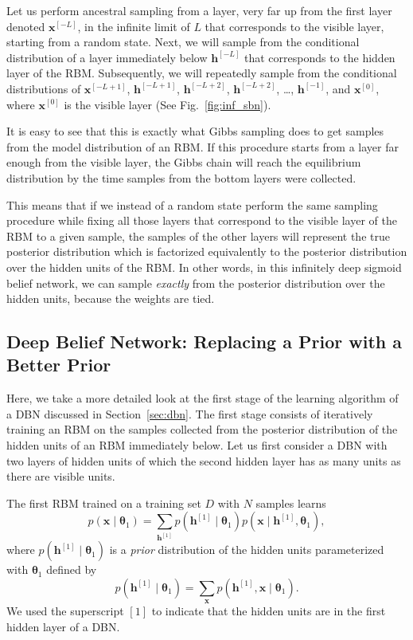 \documentclass[dissertation,nocontribution,draft*]{aaltoseries}
\newcommand{\qlay}[1]{\left[#1\right]}
\newcommand{\vect}[1]{\mathbf{#1}}
\newcommand{\vects}[1]{\boldsymbol{#1}}
\newcommand{\vh}[0]{\vect{h}}
\newcommand{\vx}[0]{\vect{x}}
\newcommand{\TT}[0]{{\vects{\theta}}}
\begin{document}
Let us perform ancestral sampling from a layer, very far up
from the first layer denoted $\vx^{\qlay{-L}}$, in the infinite
limit of $L$ that corresponds
to the visible layer, starting from a random state.  Next,
we will sample from the conditional distribution of a layer
immediately below $\vh^{\qlay{-L}}$ that corresponds to the
hidden layer of the RBM. Subsequently, we will repeatedly
sample from the conditional distributions of $\vx^{\qlay{-L+1}}$,
$\vh^{\qlay{-L+1}}$, $\vh^{\qlay{-L+2}}$, $\vh^{\qlay{-L+2}}$, \dots,
$\vh^{\qlay{-1}}$, and $\vx^{\qlay{0}}$, where $\vx^{\qlay{0}}$ is the
visible layer (See Fig.~\ref{fig:inf_sbn}). 

It is easy to see that this is exactly what Gibbs sampling
does to get samples from the model distribution of an RBM.
If this procedure starts from a layer far enough from the
visible layer, the Gibbs chain will reach the equilibrium
distribution by the time samples from the bottom layers were
collected. 

This means that if we instead of a random state perform
the same sampling procedure while fixing all those layers
that correspond to the visible layer of the RBM to a given
sample, the samples of the other layers will represent the
true posterior distribution which is factorized equivalently
to the posterior distribution over the hidden units of the
RBM. In other words, in this infinitely deep sigmoid belief
network, we can sample \textit{exactly} from the posterior
distribution over the hidden units, because the weights are
tied.

\subsection{Deep Belief Network: Replacing a Prior with a
Better Prior}
\label{sec:dbn_rbm}

Here, we take a more detailed look at the first stage of the
learning algorithm of a DBN discussed in
Section~\ref{sec:dbn}. The first stage consists of
iteratively training an RBM on the samples collected from
the posterior distribution of the hidden units of an RBM
immediately below. Let us first consider a DBN with two
layers of hidden units of which the second hidden layer has
as many units as there are visible units.

The first RBM trained on a training set $D$ with $N$ samples
learns
\[
p(\vx \mid \TT_1) = \sum_{\vh^{\qlay{1}}} p(\vh^{\qlay{1}}\mid \TT_1) p(\vx \mid
\vh^{\qlay{1}}, \TT_1),
\]
where $p(\vh^{\qlay{1}}\mid \TT_1)$ is a \textit{prior} distribution
of the hidden units parameterized with $\TT_1$ defined by
\[
p(\vh^{\qlay{1}} \mid \TT_1) = \sum_{\vx} p(\vh^{\qlay{1}}, \vx \mid \TT_1).
\]
We used the superscript $\qlay{1}$ to indicate that the hidden
units are in the first hidden layer of a DBN.
\end{document}
